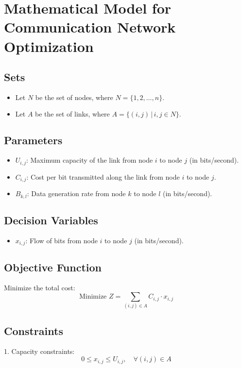 \documentclass{article}
\begin{document}
\section*{Mathematical Model for Communication Network Optimization}

\subsection*{Sets}
\begin{itemize}
    \item Let \( N \) be the set of nodes, where \( N = \{1, 2, \ldots, n\} \).
    \item Let \( A \) be the set of links, where \( A = \{(i, j) \,|\, i, j \in N\} \).
\end{itemize}

\subsection*{Parameters}
\begin{itemize}
    \item \( U_{i,j} \): Maximum capacity of the link from node \( i \) to node \( j \) (in bits/second).
    \item \( C_{i,j} \): Cost per bit transmitted along the link from node \( i \) to node \( j \).
    \item \( B_{k,l} \): Data generation rate from node \( k \) to node \( l \) (in bits/second).
\end{itemize}

\subsection*{Decision Variables}
\begin{itemize}
    \item \( x_{i,j} \): Flow of bits from node \( i \) to node \( j \) (in bits/second).
\end{itemize}

\subsection*{Objective Function}
Minimize the total cost:
\[
\text{Minimize } Z = \sum_{(i,j) \in A} C_{i,j} \cdot x_{i,j}
\]

\subsection*{Constraints}
1. Capacity constraints:
\[
0 \leq x_{i,j} \leq U_{i,j}, \quad \forall (i,j) \in A
\]
\end{document}
